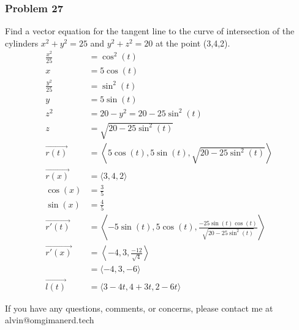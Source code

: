 \documentclass[letterpaper, 12pt]{math}
\begin{document}
\subsubsection*{Problem 27​}
Find a vector equation for the tangent line to the curve of intersection of
the cylinders \( x^2+y^2 = 25 \) and \( y^2+z^2 = 20 \) at the point
(3,4,2).
\begin{align*}
  \frac{x^2}{25} &= \cos^2(t) \\
  x &= 5\cos(t) \\
  \frac{y^2}{25} &= \sin^2(t) \\
  y &= 5\sin(t) \\
  z^2 &= 20-y^2 = 20-25\sin^2(t) \\
  z &= \sqrt{20-25\sin^2(t)} \\
  \overrightarrow{r(t)} &=
    \left\langle5\cos(t),5\sin(t),\sqrt{20-25\sin^2(t)}\right\rangle \\
  \overrightarrow{r(x)} &= \langle3,4,2\rangle \\
  \cos(x) &= \frac{3}{5} \\
  \sin(x) &= \frac{4}{5} \\
  \overrightarrow{r'(t)} &= \left\langle
    -5\sin(t),
    5\cos(t),
    \frac{-25\sin(t)\cos(t)}{\sqrt{20-25\sin^2(t)}}
  \right\rangle \\
  \overrightarrow{r'(x)} &=
    \left\langle-4,3,\frac{-12}{\sqrt{4}}\right\rangle \\
  &= \langle-4,3,-6\rangle \\
  \overrightarrow{l(t)} &= \langle3-4t,4+3t,2-6t\rangle
\end{align*}

\begin{center}
  If you have any questions, comments, or concerns, please contact me at
  alvin@omgimanerd.tech
\end{center}
\end{document}
